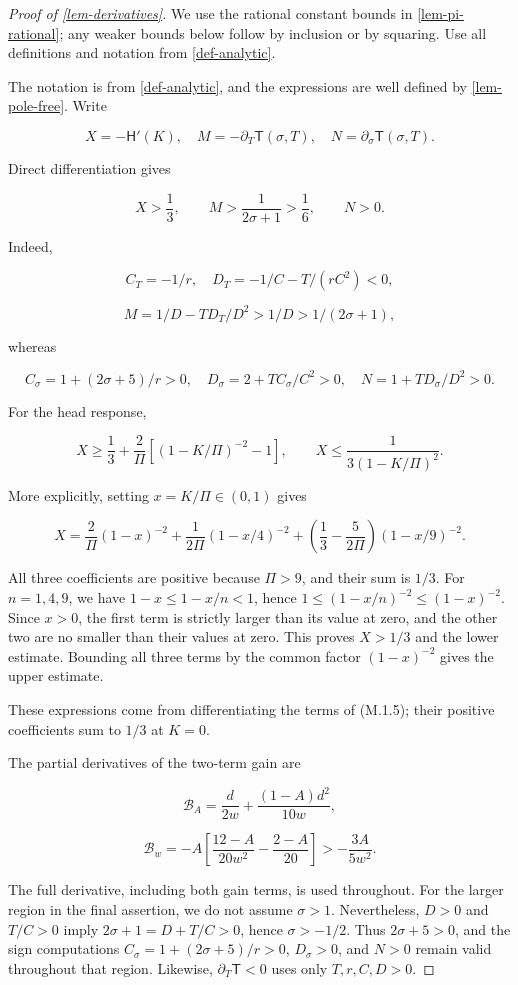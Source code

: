 \documentclass[11pt,a4paper]{article}
\theoremstyle{proofmanuscript}
\begin{document}
\begin{proof}[Proof of \ref{lem-derivatives}]

We use the rational constant bounds in \ref{lem-pi-rational}; any weaker bounds below follow by inclusion or by squaring. Use all definitions and notation from \ref{def-analytic}.

The notation is from \ref{def-analytic}, and the expressions are well defined by \ref{lem-pole-free}. Write

\[
X=-\mathsf H'(K),\quad
M=-\partial_T\mathsf T(\sigma,T),\quad
N=\partial_\sigma\mathsf T(\sigma,T).
\]

Direct differentiation gives

\[
X>\frac13,\qquad M>\frac1{2\sigma+1}>\frac16,\qquad N>0.  \tag{M.2.1}
\]

Indeed,

\[
C_T=-1/r,\quad D_T=-1/C-T/(rC^2)<0,
\]

\[
M=1/D-TD_T/D^2>1/D>1/(2\sigma+1),
\]

whereas

\[
C_\sigma=1+(2\sigma+5)/r>0,\quad
D_\sigma=2+TC_\sigma/C^2>0,\quad
N=1+TD_\sigma/D^2>0.
\]

For the head response,

\[
X\ge\frac13+\frac2\Pi\left[(1-K/\Pi)^{-2}-1\right],\qquad
X\le\frac1{3(1-K/\Pi)^2}.                                  \tag{M.2.2}
\]

More explicitly, setting \(x=K/\Pi\in(0,1)\) gives

\[
X=\frac2\Pi(1-x)^{-2}+\frac1{2\Pi}(1-x/4)^{-2}
+\left(\frac13-\frac5{2\Pi}\right)(1-x/9)^{-2}.
\]

All three coefficients are positive because \(\Pi>9\), and their sum is \(1/3\). For \(n=1,4,9\), we have \(1-x\le1-x/n<1\), hence \(1\le(1-x/n)^{-2}\le(1-x)^{-2}\). Since \(x>0\), the first term is strictly larger than its value at zero, and the other two are no smaller than their values at zero. This proves \(X>1/3\) and the lower estimate. Bounding all three terms by the common factor \((1-x)^{-2}\) gives the upper estimate.

These expressions come from differentiating the terms of (M.1.5); their positive coefficients sum to \(1/3\) at \(K=0\).

The partial derivatives of the two-term gain are

\[
\mathcal B_A=\frac d{2w}+\frac{(1-A)d^2}{10w},
\]

\[
\mathcal B_w=-A\left[\frac{12-A}{20w^2}-\frac{2-A}{20}\right]
>-\frac{3A}{5w^2}.                                        \tag{M.2.3}
\]

The full derivative, including both gain terms, is used throughout. For the larger region in the final assertion, we do not assume \(\sigma>1\). Nevertheless, \(D>0\) and \(T/C>0\) imply \(2\sigma+1=D+T/C>0\), hence \(\sigma>-1/2\). Thus \(2\sigma+5>0\), and the sign computations \(C_\sigma=1+(2\sigma+5)/r>0\), \(D_\sigma>0\), and \(N>0\) remain valid throughout that region. Likewise, \(\partial_T\mathsf T<0\) uses only \(T,r,C,D>0\).

\end{proof}
\end{document}

